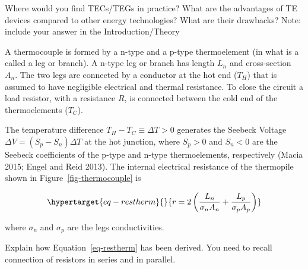 \documentclass[
  letterpaper,
  DIV=11,
  numbers=noendperiod]{scrreprt}
\begin{document}
\begin{tcolorbox}[enhanced jigsaw, toprule=.15mm, coltitle=black, bottomrule=.15mm, colbacktitle=quarto-callout-tip-color!10!white, opacitybacktitle=0.6, titlerule=0mm, colframe=quarto-callout-tip-color-frame, title=\textcolor{quarto-callout-tip-color}{\faLightbulb}\hspace{0.5em}{Question 1}, leftrule=.75mm, bottomtitle=1mm, breakable, opacityback=0, arc=.35mm, left=2mm, colback=white, rightrule=.15mm, toptitle=1mm]

Where would you find TECs/TEGs in practice? What are the advantages of
TE devices compared to other energy technologies? What are their
drawbacks? Note: include your answer in the Introduction/Theory

\end{tcolorbox}

A thermocouple is formed by a n-type and a p-type thermoelement (in what
is a called a leg or branch). A n-type leg or branch has length
\(L_{n}\) and cross-section \(A_{n}\). The two legs are connected by a
conductor at the hot end (\(T_{H}\)) that is assumed to have negligible
electrical and thermal resistance. To close the circuit a load resistor,
with a resistance \(R\), is connected between the cold end of the
thermoelements (\(T_{C}\)).

The temperature difference \(T_{H} - T_{C} \equiv \Delta T > 0\)
generates the Seebeck Voltage
\(\Delta V = \left( S_{p} - S_{n} \right)\Delta T\) at the hot junction,
where \(S_{p} > 0\) and \(S_{n} < 0\) are the Seebeck coefficients of
the p-type and n-type thermoelements, respectively (Macia 2015; Engel
and Reid 2013). The internal electrical resistance of the thermopile
shown in Figure~\ref{fig-thermocouple} is

\begin{equation}\protect\hypertarget{eq-restherm}{}{r = 2\left( \frac{L_{n}}{\sigma_{n}A_{n}} + \frac{L_{p}}{\sigma_{p}A_{p}} \right)}\label{eq-restherm}\end{equation}

where \(\sigma_{n}\) and \(\sigma_{p}\) are the legs conductivities.

\begin{tcolorbox}[enhanced jigsaw, toprule=.15mm, coltitle=black, bottomrule=.15mm, colbacktitle=quarto-callout-tip-color!10!white, opacitybacktitle=0.6, titlerule=0mm, colframe=quarto-callout-tip-color-frame, title=\textcolor{quarto-callout-tip-color}{\faLightbulb}\hspace{0.5em}{Question 2}, leftrule=.75mm, bottomtitle=1mm, breakable, opacityback=0, arc=.35mm, left=2mm, colback=white, rightrule=.15mm, toptitle=1mm]

Explain how Equation~\ref{eq-restherm} has been derived. You need to
recall connection of resistors in series and in parallel.

\end{tcolorbox}
\end{document}
